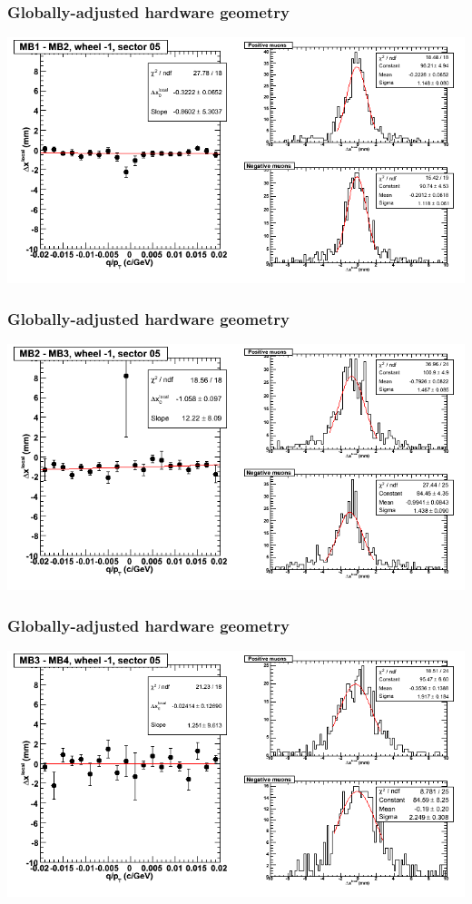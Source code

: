 \documentclass[compress]{beamer}
\begin{document}
\begin{frame}
\frametitle{Globally-adjusted hardware geometry}
\includegraphics[width=\linewidth]{NOV4_segdiffs_HW/dt13_resid_B_05_12.png}
\end{frame}

\begin{frame}
\frametitle{Globally-adjusted hardware geometry}
\includegraphics[width=\linewidth]{NOV4_segdiffs_HW/dt13_resid_B_05_23.png}
\end{frame}

\begin{frame}
\frametitle{Globally-adjusted hardware geometry}
\includegraphics[width=\linewidth]{NOV4_segdiffs_HW/dt13_resid_B_05_34.png}
\end{frame}
\end{document}

